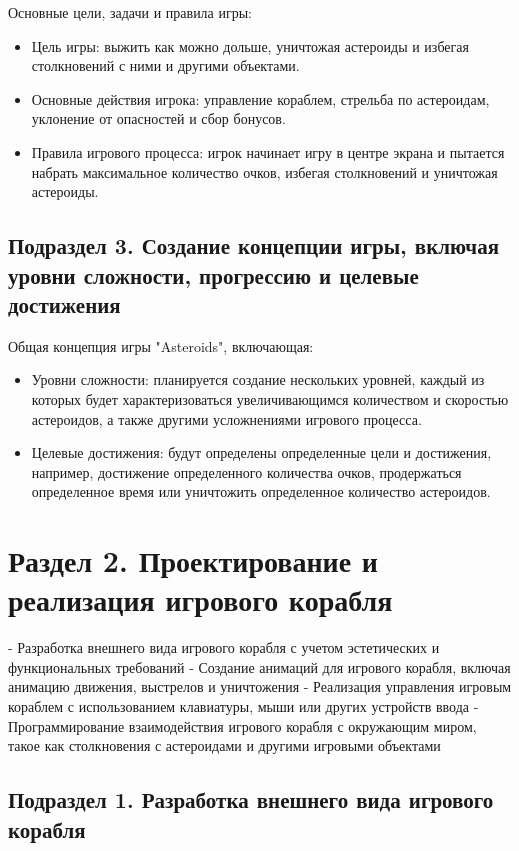 Основные цели, задачи и правила игры:
\begin{itemize}
    \item Цель игры: выжить как можно дольше, уничтожая астероиды и избегая столкновений с ними и другими объектами.
    \item Основные действия игрока: управление кораблем, стрельба по астероидам, уклонение от опасностей и сбор бонусов.
    \item Правила игрового процесса: игрок начинает игру в центре экрана и пытается набрать максимальное количество очков, избегая столкновений и уничтожая астероиды.
\end{itemize}

\subsection{\label{subsec:ch02/sec01/sub03}Подраздел 3. Создание концепции игры, включая уровни сложности, прогрессию и целевые достижения}

Общая концепция игры "Asteroids", включающая:
\begin{itemize}
    \item Уровни сложности: планируется создание нескольких уровней, каждый из которых будет характеризоваться увеличивающимся количеством и скоростью астероидов, а также другими усложнениями игрового процесса.
    \item Целевые достижения: будут определены определенные цели и достижения, например, достижение определенного количества очков, продержаться определенное время или уничтожить определенное количество астероидов.
\end{itemize}

\section{\label{sec:ch02/sec01}Раздел 2. Проектирование и реализация игрового корабля}

- Разработка внешнего вида игрового корабля с учетом эстетических и функциональных требований
- Создание анимаций для игрового корабля, включая анимацию движения, выстрелов и уничтожения
- Реализация управления игровым кораблем с использованием клавиатуры, мыши или других устройств ввода
- Программирование взаимодействия игрового корабля с окружающим миром, такое как столкновения с астероидами и другими игровыми объектами

\subsection{\label{subsec:ch02/sec01/sub01}Подраздел 1. Разработка внешнего вида игрового корабля}

